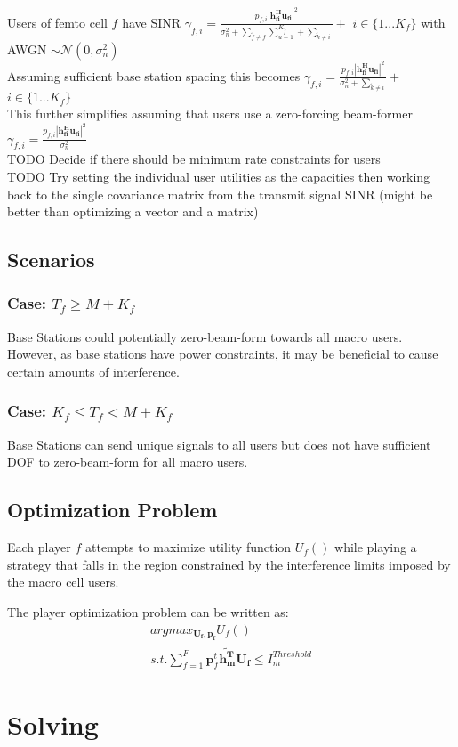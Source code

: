 \documentclass[12pt]{article}
\begin{document}
Users of femto cell $f$ have SINR $\gamma_{f,i} = \frac{p_{f,i}|\mathbf{h^H_{fi}u_{fi}}|^2}
{\sigma^2_{n}  + \sum_{\tilde{f}\neq f} \sum_{u=1}^{K_{\tilde{f}}} + \sum_{\tilde{k}\neq i}}+$   $i \in \{1 ... K_f\}$
with AWGN $\sim \mathcal{N}(0,\sigma^2_n)$
\\

Assuming sufficient base station spacing this becomes 
$\gamma_{f,i} = \frac{p_{f,i}|\mathbf{h^H_{fi}u_{fi}}|^2}
{\sigma^2_{n}  +  \sum_{\tilde{k}\neq i}}+$   $i \in \{1 ... K_f\}$
\\

This further simplifies assuming that users use a zero-forcing beam-former
$\gamma_{f,i} = \frac{p_{f,i}|\mathbf{h^H_{fi}u_{fi}}|^2}{\sigma^2_{n} }$
\\

TODO Decide if there should be minimum rate constraints for users
\\

TODO Try setting the individual user utilities as the capacities then working back to the single covariance matrix from the transmit signal SINR (might be better than optimizing a vector and a matrix)

\subsection{Scenarios}

\subsubsection{Case: $T_f \geq M + K_f$}
Base Stations could potentially zero-beam-form towards all macro users. However, as base stations have power constraints, it may be beneficial to cause certain amounts of interference. 

\subsubsection{Case: $K_f \leq T_f < M + K_f$}
Base Stations can send unique signals to all users but does not have sufficient DOF to zero-beam-form for all macro users.


\subsection{Optimization Problem}

Each player $f$ attempts to maximize utility function $U_f()$ while playing a strategy that falls in the region constrained by the interference limits imposed by the macro cell users.

The player optimization problem can be written as:
\\

\begin{gather*} 
argmax_{\mathbf{U_f,\mathbf{p}_f}} U_f() 
\\
s.t. \sum^F_{f=1} \mathbf{p}_f^t \mathbf{\tilde{h_m^T}}  \mathbf{U_f}  \leq I^{Threshold}_{m} 
\end{gather*}


\section{Solving}
\end{document}
